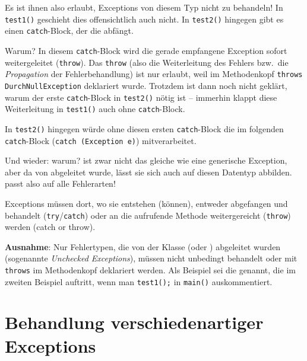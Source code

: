 Es ist ihnen also erlaubt, Exceptions von diesem Typ nicht zu behandeln! In
\lstinline|test1()| geschieht dies offensichtlich auch nicht. In
\lstinline|test2()| hingegen gibt es einen \lstinline|catch|-Block, der die
 abfängt.

Warum? In diesem \lstinline|catch|-Block wird die gerade empfangene Exception
sofort weitergeleitet (\lstinline|throw|). Das \lstinline|throw| (also die
Weiterleitung des Fehlers bzw.\ die \emph{Propagation} der Fehlerbehandlung)
ist nur erlaubt, weil im Methodenkopf \lstinline|throws DurchNullException|
deklariert wurde. Trotzdem ist dann noch nicht geklärt, warum der erste
\lstinline|catch|-Block in \lstinline|test2()| nötig ist -- immerhin klappt
diese Weiterleitung in \lstinline|test1()| auch ohne \lstinline|catch|-Block.

In \lstinline|test2()| hingegen würde ohne diesen ersten
\lstinline|catch|-Block die  im folgenden
\lstinline|catch|-Block (\lstinline|catch (Exception e)|) mitverarbeitet.

Und wieder: warum?  ist zwar nicht das gleiche wie
eine generische Exception, aber da  von
 abgeleitet wurde, lässt sie sich auch auf diesen Datentyp
abbilden.  passt also auf alle Fehlerarten!

\medskip

\begin{tcolorbox}[colback=blue!5,colframe=lightblue,boxrule=0.8pt,arc=3pt,title={\textbf{Merksatz}}]
\small
Exceptions müssen dort, wo sie entstehen (können), entweder
abgefangen und behandelt (\lstinline|try|/\lstinline|catch|) oder an die
aufrufende Methode weitergereicht (\lstinline|throw|) werden (\glqq catch or
throw\grqq ).
\end{tcolorbox} 

\medskip

\textbf{Ausnahme}: Nur Fehlertypen, die von der Klasse
 (oder ) abgeleitet wurden
(sogenannte \emph{Unchecked Exceptions}), müssen nicht unbedingt behandelt
oder mit \lstinline|throws| im Methodenkopf deklariert werden. Als Beispiel sei
die  genannt, die im zweiten Beispiel auftritt,
wenn man \lstinline|test1();| in \lstinline|main()| auskommentiert.


\section{Behandlung verschiedenartiger Exceptions}



